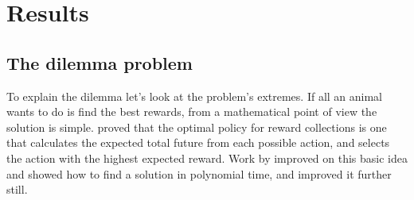 \documentclass[9pt,lineno]{elife}
\begin{document}
\section{Results}


\subsection{The dilemma problem}
To explain the dilemma let's look at the problem's extremes. If all an animal wants to do is find the best rewards, from a mathematical point of view the solution is simple. \cite{gittins1974dynamic} proved that the optimal policy for reward collections is one that calculates the expected total future from each possible action, and selects the action with the highest expected reward. Work by \cite{Kearns2002} improved on this basic idea and showed how to find a solution in polynomial time, and \cite{Brafman2002} improved it further still. 
\end{document}
